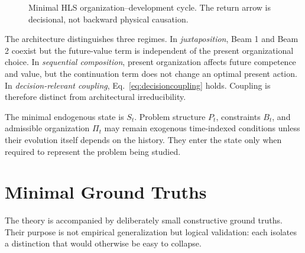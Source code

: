 \documentclass[10pt]{article}
\newcommand{\Ccap}{\mathcal{C}}
\begin{document}
\begin{figure}[t]
\centering
{}
\caption{Minimal HLS organization--development cycle. The return arrow is decisional, not backward physical causation.}
\label{fig:hls}
\end{figure}

The architecture distinguishes three regimes. In \emph{juxtaposition}, Beam 1 and Beam 2 coexist but the future-value term is independent of the present organizational choice. In \emph{sequential composition}, present organization affects future competence and value, but the continuation term does not change an optimal present action. In \emph{decision-relevant coupling}, Eq.~\eqref{eq:decisioncoupling} holds. Coupling is therefore distinct from architectural irreducibility.

The minimal endogenous state is $S_t$. Problem structure $P_t$, constraints $B_t$, and admissible organization $\Pi_t$ may remain exogenous time-indexed conditions unless their evolution itself depends on the history. They enter the state only when required to represent the problem being studied.

\section{Minimal Ground Truths}

The theory is accompanied by deliberately small constructive ground truths. Their purpose is not empirical generalization but logical validation: each isolates a distinction that would otherwise be easy to collapse.
\end{document}
